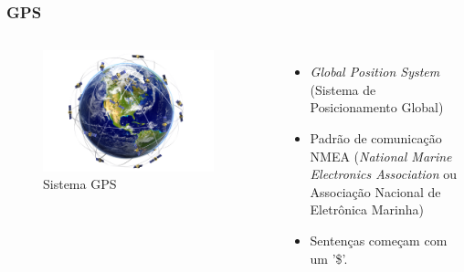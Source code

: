 \begin{frame}
\frametitle{GPS}
\begin{columns}

	\begin{figure}[]
	 \centering
	 \captionsetup{width=0.9\textwidth,font=footnotesize,textfont=bf}
	 \includegraphics[width=0.9\textwidth,keepaspectratio]{Figuras/gps.jpg}
	 \caption{Sistema GPS}
	\end{figure}
	
	\begin{itemize}
	\item \textit{Global Position System} (Sistema de Posicionamento Global)
	\pause
	\item Padrão de comunicação NMEA (\textit{National Marine Electronics Association} ou Associação Nacional de Eletrônica Marinha)
	\item Sentenças começam com um '\$'.
	\end{itemize}

\end{columns}
\end{frame}

%
%
%	
%






